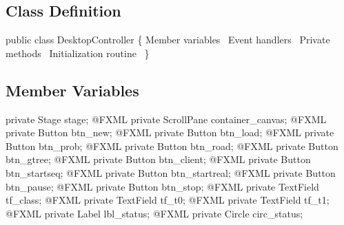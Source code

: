 \subsection{Class Definition}
\nwenddocs{}\endmoddef{}
public class DesktopController \{
  \LA{}Member variables~{\nwtagstyle{}}\RA{}
  \LA{}Event handlers~{\nwtagstyle{}}\RA{}
  \LA{}Private methods~{\nwtagstyle{}}\RA{}
  \LA{}Initialization routine~{\nwtagstyle{}}\RA{}
\}
\nwendcode{}\nwdocspar

\subsection{Member Variables}
\nwenddocs{}\endmoddef{}
private Stage stage;
\eatline
{}\nwendcode{}\nwdocspar
\nwenddocs{}\plusendmoddef
@FXML private ScrollPane container_canvas;
@FXML private Button btn_new;
@FXML private Button btn_load;
@FXML private Button btn_prob;
@FXML private Button btn_road;
@FXML private Button btn_gtree;
@FXML private Button btn_client;
@FXML private Button btn_startseq;
@FXML private Button btn_startreal;
@FXML private Button btn_pause;
@FXML private Button btn_stop;
@FXML private TextField tf_class;
@FXML private TextField tf_t0;
@FXML private TextField tf_t1;
@FXML private Label lbl_status;
@FXML private Circle circ_status;
\nwendcode{}\nwdocspar


